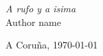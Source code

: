 
{\it
 A rufo y a isima
}
\\ 

\normalfont
\vspace{1cm}
\hfill{Author name}

\hfill{A Coruña, \today}